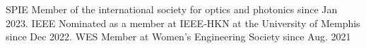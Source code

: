 


\begin{cvskills}

  \cvskill
  {SPIE}
  {Member of the international society for optics and photonics since Jan 2023.}
  \cvskill
    {IEEE}
    {Nominated as a member at IEEE‑HKN at the University of Memphis since Dec 2022.}
  \cvskill
    {WES} %
    {Member at Women's Engineering Society since Aug. 2021} %
\end{cvskills}